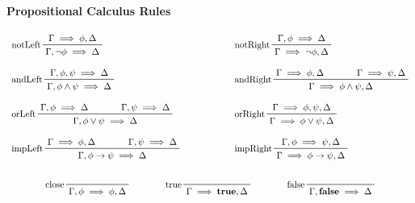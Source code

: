 			\paragraph{Propositional Calculus Rules}
				\begin{gather*}
					\begin{array}{lcl}
						\prftree[l]{notLeft}{\Gamma \implies \phi, \Delta}{\Gamma, \lnot\phi \implies \Delta} &\quad\quad\quad\quad& \prftree[l]{notRight}{\Gamma, \phi \implies \Delta}{\Gamma \implies \lnot\phi, \Delta} \\\\
						\prftree[l]{andLeft}{\Gamma, \phi, \psi \implies \Delta}{\Gamma, \phi \land \psi \implies \Delta} && \prftree[l]{andRight}{\Gamma \implies \phi, \Delta}{\qquad}{\Gamma \implies \psi, \Delta}{\Gamma \implies \phi \land \psi, \Delta} \\\\
						\prftree[l]{orLeft}{\Gamma, \phi \implies \Delta}{\qquad}{\Gamma, \psi \implies \Delta}{\Gamma, \phi \lor \psi \implies \Delta} && \prftree[l]{orRight}{\Gamma \implies \phi, \psi, \Delta}{\Gamma \implies \phi \lor \psi, \Delta} \\\\
						\prftree[l]{impLeft}{\Gamma \implies \phi, \Delta}{\qquad}{\Gamma, \psi \implies \Delta}{\Gamma, \phi \to \psi \implies \Delta} && \prftree[l]{impRight}{\Gamma, \phi \implies \psi, \Delta}{\Gamma \implies \phi \to \psi, \Delta}
					\end{array} \\\\
					\prftree[l]{close}{\Gamma, \phi \implies \phi, \Delta} \quad\quad\quad\quad \prftree[l]{true}{\Gamma \implies \textbf{true}, \Delta} \quad\quad\quad\quad \prftree[l]{false}{\Gamma, \textbf{false} \implies \Delta}
				\end{gather*}


